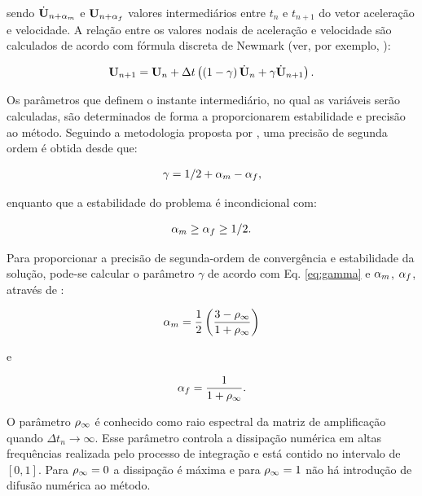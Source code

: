 \documentclass[tese_patricia]{subfiles}%
\begin{document}
\noindent sendo $\dot{\mathbf{U}}_{n+\alpha_m}$ e $\mathbf{U}_{n+\alpha_f}$ valores intermediários entre $t_{n}$ e $t_{n+1}$ do vetor aceleração e velocidade. A relação entre os valores nodais de aceleração e velocidade são calculados de acordo com fórmula discreta de Newmark (ver, por exemplo, \cite{Hughes:1976}):

\begin{gather}
\mathbf{U}_{n+1} = \mathbf{U}_n + \Delta t\left(\left(1-\gamma\right)\dot{\mathbf{U}}_n + \gamma\dot{\mathbf{U}}_{n+1} \right). \label{eq:newmark}
\end{gather}

Os parâmetros que definem o instante intermediário, no qual as variáveis serão calculadas, são determinados de forma a proporcionarem estabilidade e precisão ao método. Seguindo a metodologia proposta por , uma precisão de segunda ordem é obtida desde que: 

\begin{gather}
\gamma = 1/2 + \alpha_m - \alpha_f,\label{eq:gamma}
\end{gather}

\noindent enquanto que a estabilidade do problema é incondicional com:

\begin{gather}
\alpha_m \ge \alpha_f \ge 1/2.
\end{gather}

Para proporcionar a precisão de segunda-ordem de convergência e estabilidade da solução, pode-se calcular o parâmetro $\gamma$ de acordo com Eq. \ref {eq:gamma} e $\alpha_m$, $\alpha_f$, através de \cite{Hughes:2000}:


\begin{gather}
\alpha_m = \frac{1}{2}\left(\frac{3 - \rho_\infty}{1+\rho_\infty}\right)\label{eq:alpha_m_fluid}\\
\end{gather}

\noindent e

\begin{gather}
\alpha_f = \frac{1}{1+\rho_\infty}\label{eq:alpha_f_fluid}.
\end{gather}

O parâmetro $\rho_\infty$ é conhecido como raio espectral da matriz de amplificação quando $\Delta t_{n} \rightarrow \infty$. Esse parâmetro controla a dissipação numérica em altas frequências realizada pelo processo de integração e está contido no intervalo de $[0,1]$. Para $\rho_\infty = 0$ a dissipação é máxima e para $\rho_\infty = 1$ não há introdução de difusão numérica ao método.
\end{document}

